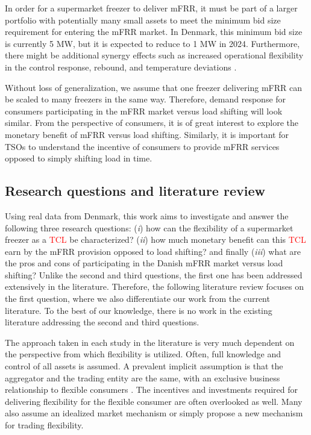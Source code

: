 \documentclass[11pt,a4paper]{article}
\begin{document}
In order for a supermarket freezer to deliver mFRR, it must be part of a larger portfolio with potentially many small assets to meet the minimum bid size requirement for entering the mFRR market. In Denmark, this minimum bid size is currently 5 MW, but it is expected to reduce to 1 MW in 2024. Furthermore, there might be additional synergy effects such as increased operational flexibility in the control response, rebound, and temperature deviations \cite{koch2011modeling}.

Without loss of generalization, we assume that one freezer delivering mFRR can be scaled to many freezers in the same way. Therefore,
demand response for consumers participating in the mFRR market versus load shifting will  look similar. From the perspective of consumers, it is of great interest to explore the monetary benefit of mFRR versus load shifting. Similarly, it is important for TSOs to understand the incentive of consumers to provide mFRR services opposed to simply shifting load in time.

\subsection{Research questions and literature review}
%
Using real data from Denmark, this work aims to investigate and answer the following three research questions: (\textit{i}) how can the flexibility of a supermarket freezer as a \textcolor{red}{TCL} be characterized?
(\textit{ii}) how much monetary benefit can this \textcolor{red}{TCL} earn by the mFRR provision opposed to load shifting? and finally (\textit{iii})
what are the pros and cons of participating in the Danish mFRR market versus load shifting? Unlike the second and third questions, the first one has been addressed extensively in the literature. Therefore, the following literature review focuses on the first question, where we also differentiate our work from the current literature. To the best of our knowledge, there is no  work in the existing literature addressing the second and third questions.  





The approach taken in each study in the literature is very much dependent on the perspective from which flexibility is utilized. Often, full knowledge and control of all assets is assumed. A prevalent implicit assumption is that the aggregator and the trading entity are the same, with an exclusive business relationship to flexible consumers \cite{gade2022ecosystem}. The incentives and investments required for delivering flexibility for the flexible consumer are often overlooked as well. Many also assume an idealized market mechanism or simply propose a new mechanism for trading flexibility.
\end{document}
